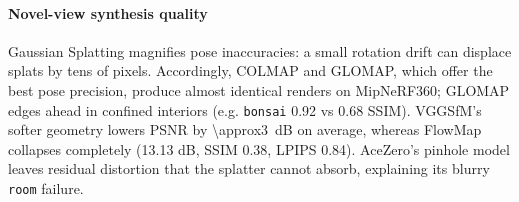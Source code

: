 \paragraph{Novel-view synthesis quality}
Gaussian Splatting magnifies pose inaccuracies: a small rotation drift can displace splats by tens of pixels. 
Accordingly, COLMAP and GLOMAP, which offer the best pose precision, produce almost identical renders on MipNeRF360; GLOMAP edges ahead in confined interiors (e.g. \texttt{bonsai} 0.92 vs 0.68 SSIM).
VGGSfM's softer geometry lowers PSNR by \SI{\approx3}{dB} on average, whereas FlowMap collapses completely (13.13 dB, SSIM 0.38, LPIPS 0.84).  
AceZero's pinhole model leaves residual distortion that the splatter cannot absorb, explaining its blurry \texttt{room} failure.

